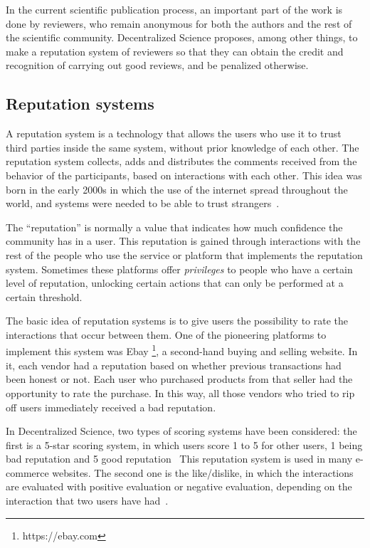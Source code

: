 In the current scientific publication process, an important part of the work is
done by reviewers, who remain anonymous for both the authors and the rest of the
scientific community. Decentralized Science proposes, among other things, to
make a reputation system of reviewers so that they can obtain the credit and
recognition of carrying out good reviews, and be penalized otherwise.

\subsection{Reputation systems}
\label{scb:rs}

A reputation system is a technology that allows the users who use it to trust
third parties inside the same system, without prior knowledge of each other. The
reputation system collects, adds and distributes the comments received from the
behavior of the participants, based on interactions with each other. This idea
was born in the early 2000s in which the use of the internet spread throughout
the world, and systems were needed to be able to trust
strangers~\cite{resnick2000reputation}.

The ``reputation'' is normally a value that indicates how much confidence the
community has in a user. This reputation is gained through interactions with the
rest of the people who use the service or platform that implements the
reputation system. Sometimes these platforms offer \emph{privileges} to people
who have a certain level of reputation, unlocking certain actions that can only
be performed at a certain threshold.

The basic idea of reputation systems is to give users the possibility to rate
the interactions that occur between them. One of the pioneering platforms to
implement this system was Ebay \footnote{https://ebay.com}, a second-hand buying
and selling website. In it, each vendor had a reputation based on whether
previous transactions had been honest or not. Each user who purchased products
from that seller had the opportunity to rate the purchase. In this way, all
those vendors who tried to rip off users immediately received a bad reputation.

In Decentralized Science, two types of scoring systems have been considered: the
first is a 5-star scoring system, in which users score 1 to 5 for other users, 1
being bad reputation and 5 good reputation~\cite{} This reputation system is
used in many e-commerce websites. The second one is the like/dislike, in which
the interactions are evaluated with positive evaluation or negative evaluation,
depending on the interaction that two users have had~\cite{}.


